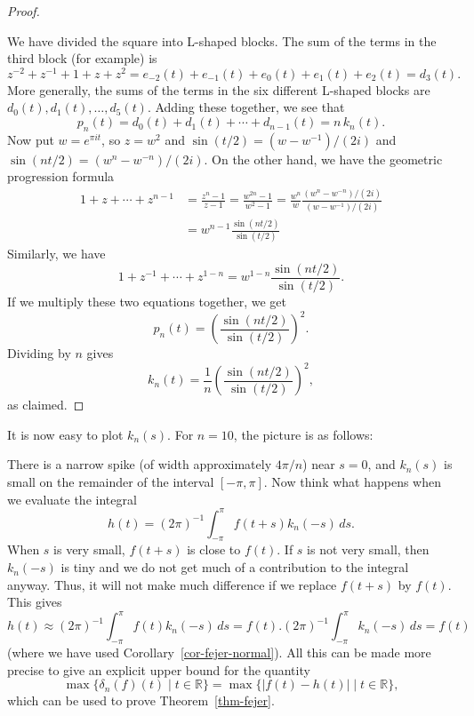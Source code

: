 \documentclass{amsart}
\newcommand{\R}         {{\mathbb{R}}}
\newcommand{\dl}        {\delta}
\newcommand{\st}        {\;|\;}
\renewcommand{\:}       {\colon}
\theoremstyle{definition}
\begin{document}
\begin{proof}
\begin{center}
 \end{center}
 We have divided the square into L-shaped blocks.  The sum
 of the terms in the third block (for example) is 
 \[ z^{-2}+z^{-1}+1+z+z^2 = 
    e_{-2}(t)+e_{-1}(t)+e_0(t)+e_1(t)+e_2(t) =
    d_3(t).
 \]
 More generally, the sums of the terms in the six different
 L-shaped blocks are $d_0(t),d_1(t),\dotsc,d_5(t)$.  Adding
 these together, we see that 
 \[ p_n(t) = d_0(t)+d_1(t)+\dotsb+d_{n-1}(t) = n\,k_n(t). \]
 Now put $w=e^{\pi i t}$, so $z=w^2$ and
 $\sin(t/2)=(w-w^{-1})/(2i)$ and
 $\sin(nt/2)=(w^n-w^{-n})/(2i)$.  On the other hand, we have
 the geometric progression formula 
 \begin{align*}
   1+z+\dotsb+z^{n-1}
    &= \frac{z^n-1}{z-1} 
     = \frac{w^{2n}-1}{w^2-1} 
     = \frac{w^n}{w}\frac{(w^n-w^{-n})/(2i)}{(w-w^{-1})/(2i)} \\
    &= w^{n-1} \frac{\sin(nt/2)}{\sin(t/2)} 
 \end{align*}
 Similarly, we have
 \[ 1+z^{-1}+\dotsb+z^{1-n} =
     w^{1-n} \frac{\sin(nt/2)}{\sin(t/2)}.
 \]
 If we multiply these two equations together, we get
 \[ p_n(t) = \left(\frac{\sin(nt/2)}{\sin(t/2)}\right)^2. \]
 Dividing by $n$ gives
 \[ k_n(t) =
     \frac{1}{n}\left(\frac{\sin(nt/2)}{\sin(t/2)}\right)^2,
 \]
 as claimed.
\end{proof}

It is now easy to plot $k_n(s)$.  For $n=10$, the picture is
as follows:
\begin{center}
\end{center}
There is a narrow spike (of width approximately $4\pi/n$)
near $s=0$, and $k_n(s)$ is small on the remainder of the
interval $[-\pi,\pi]$.  Now think what happens when we
evaluate the integral 
\[ h(t)=(2\pi)^{-1}\int_{-\pi}^\pi f(t+s)k_n(-s)\,ds. \]
When $s$ is very small, $f(t+s)$ is close to $f(t)$.  If $s$
is not very small, then $k_n(-s)$ is tiny and we do not get
much of a contribution to the integral anyway.  Thus, it
will not make much difference if we replace $f(t+s)$ by
$f(t)$.  This gives
\[ h(t) \approx
   (2\pi)^{-1}\int_{-\pi}^\pi f(t)k_n(-s)\,ds = 
   f(t).(2\pi)^{-1}\int_{-\pi}^\pi k_n(-s)\,ds = f(t)
\]
(where we have used Corollary~\ref{cor-fejer-normal}).  All
this can be made more precise to give an explicit upper
bound for the quantity
\[ \max\{\dl_n(f)(t)\st t\in\R\} = 
   \max\{|f(t)-h(t)|\st t\in\R\}, 
\]
which can be used to prove Theorem~\ref{thm-fejer}.
\end{document}
